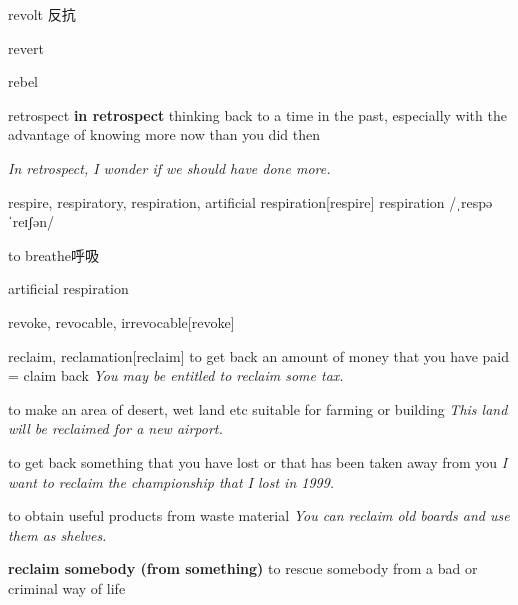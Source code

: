 \begin{DefWord}{revolt}
    反抗
\end{DefWord}

\begin{DefWord}{revert}
\end{DefWord}

\begin{DefWord}{rebel}
\end{DefWord}

\begin{DefWord}{retrospect}
    \textbf{in retrospect} thinking back to a time in the past, especially with the advantage of knowing more now than you did then

    \textit{In retrospect, I wonder if we should have done more.}
\end{DefWord}

\begin{DefWord}{respire, respiratory, respiration, artificial respiration}[respire]
    respiration /ˌrespəˈreɪʃən/ 

    to breathe呼吸

    artificial respiration
\end{DefWord}

\begin{DefWord}{revoke, revocable, irrevocable}[revoke]
\end{DefWord}

\begin{RefWord}{reclaim, reclamation}[reclaim]
    to get back an amount of money that you have paid = claim back
    \textit{You may be entitled to reclaim some tax.}

    to make an area of desert, wet land etc suitable for farming or building
    \textit{This land will be reclaimed for a new airport.}

    to get back something that you have lost or that has been taken away from you
    \textit{I want to reclaim the championship that I lost in 1999.}

    to obtain useful products from waste material
    \textit{You can reclaim old boards and use them as shelves.}

    \textbf{reclaim somebody (from something)} to rescue somebody from a bad or criminal way of life
\end{RefWord}